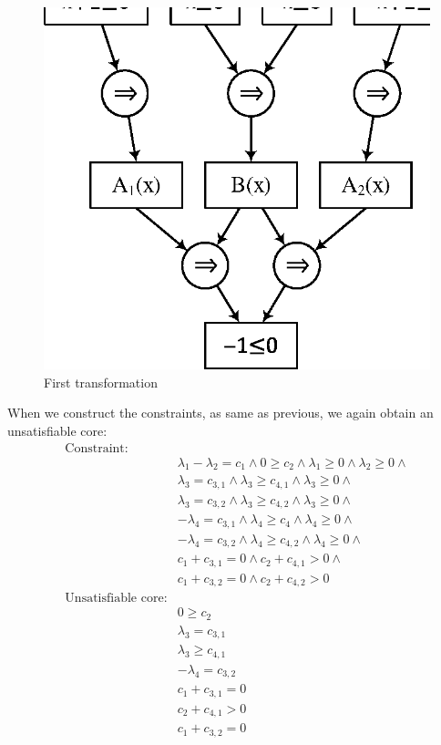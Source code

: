 \begin{figure}
  \begin{center}
    \includegraphics[scale=0.8]{figures/ex3-2.eps}
  \end{center}
  \caption{First transformation}
  \label{fig:ex32}
\end{figure}
When we construct the constraints, as same as previous, we again
obtain an unsatisfiable core:
\begin{align*}
\text{Constraint:} \\
& \lambda_1 - \lambda_2 = c_1 \wedge 0 \geq c_2 \wedge \lambda_1 \geq 0 \wedge \lambda_2 \geq 0 \wedge \\
& \lambda_3 = c_{3,1} \wedge \lambda_3 \geq c_{4,1} \wedge \lambda_3 \geq 0 \wedge \\
& \lambda_3 = c_{3,2} \wedge \lambda_3 \geq c_{4,2} \wedge \lambda_3 \geq 0 \wedge \\
& - \lambda_4 = c_{3,1} \wedge \lambda_4 \geq c_4 \wedge \lambda_4 \geq 0 \wedge \\
& - \lambda_4 = c_{3,2} \wedge \lambda_4 \geq c_{4,2} \wedge \lambda_4 \geq 0 \wedge \\
& c_1 + c_{3,1} = 0 \wedge c_2 + c_{4,1} > 0 \wedge \\
& c_1 + c_{3,2} = 0 \wedge c_2 + c_{4,2} > 0
\\
\text{Unsatisfiable core:} \\
& 0 \geq c_2 \\
& \lambda_3 = c_{3,1} \\
& \lambda_3 \geq c_{4,1} \\
& - \lambda_4 = c_{3,2} \\
& c_1 + c_{3,1} = 0 \\ & c_2 + c_{4,1} > 0 \\
& c_1 + c_{3,2} = 0
\end{align*}
